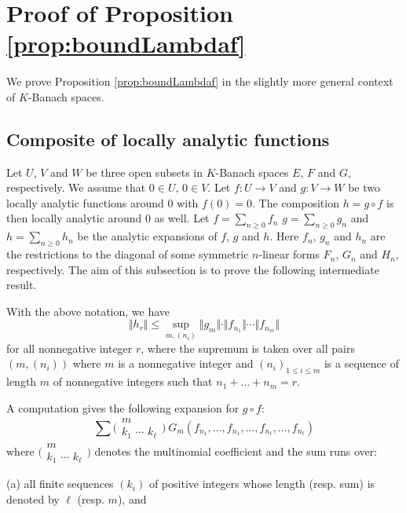 \documentclass{sig-alternate}
\def\binom#1#2{\Big(\begin{array}{cc} #1 \\ #2 \end{array}\Big)}
\begin{document}
\appendix

\section{Proof of Proposition \ref{prop:boundLambdaf}}
\label{app:proof}

We prove Proposition \ref{prop:boundLambdaf} in the slightly more
general context of $K$-Banach spaces.

\subsection{Composite of locally analytic functions}

Let $U$, $V$ and $W$ be three open subsets in $K$-Banach spaces 
$E$, $F$ and $G$, respectively. We assume that $0 \in U$, $0 \in V$. Let 
$f : U \to V$ and $g : V \to W$ be two locally analytic functions around 
$0$ with $f(0) = 0$. The composition $h = g \circ f$ is then locally 
analytic around $0$ as well. Let $f = \sum_{n \geq 0} f_n$
$g = \sum_{n \geq 0} g_n$ and $h = \sum_{n \geq 0} h_n$ be the
analytic expansions of $f$, $g$ and $h$.
Here $f_n$, $g_n$ and $h_n$ are the restrictions to the diagonal of 
some symmetric $n$-linear forms $F_n$, $G_n$ and $H_n$, respectively. The 
aim of this subsection is to prove the following intermediate result.

\begin{prop}
\label{prop:boundhr}
With the above notation, we have
$$\Vert h_r \Vert \leq \sup_{m, (n_i)}
  \Vert g_m \Vert \cdot \Vert f_{n_1} \Vert \cdots \Vert f_{n_m} \Vert$$
for all nonnegative integer $r$, where the supremum is taken over all pairs $(m, (n_i))$ where $m$
is a nonnegative integer and $(n_i)_{1 \leq i \leq m}$ is a sequence of
length $m$ of nonnegative integers such that $n_1 + \ldots + n_m = r$.
\end{prop}

A computation gives the following expansion for $g \circ f$:
\begin{equation}
\label{eq:expansiongf}
\sum \binom m {\!k_1 \,\, \cdots \,\, k_\ell\!} \:
G_m(f_{n_1}, \ldots, f_{n_1}, \ldots, f_{n_\ell}, \ldots, f_{n_\ell})
\end{equation}
where $\binom m {\!k_1 \,\, \cdots \,\, k_\ell\!}$ denotes the
multinomial coefficient and the sum runs over:

\noindent
(a) all finite sequences $(k_i)$ of positive integers whose length 
(resp. sum) is denoted by $\ell$ (resp. $m$), and
\end{document}
